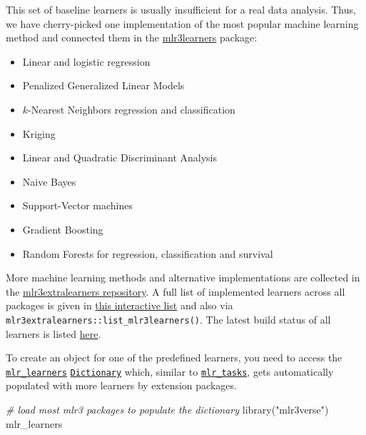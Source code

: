 \documentclass[
]{scrbook}
\newenvironment{Shaded}{\begin{snugshade}}{\end{snugshade}}
\newcommand{\CommentTok}[1]{\textcolor[rgb]{0.56,0.35,0.01}{\textit{#1}}}
\newcommand{\FunctionTok}[1]{\textcolor[rgb]{0.00,0.00,0.00}{#1}}
\newcommand{\NormalTok}[1]{#1}
\newcommand{\StringTok}[1]{\textcolor[rgb]{0.31,0.60,0.02}{#1}}
\providecommand{\tightlist}{%
  \setlength{\itemsep}{0pt}\setlength{\parskip}{0pt}}
\renewenvironment{Shaded} {\begin{snugshade}\small} {\end{snugshade}}
\begin{document}
This set of baseline learners is usually insufficient for a real data analysis.
Thus, we have cherry-picked one implementation of the most popular machine learning method and connected them in the \href{https://mlr3learners.mlr-org.com}{mlr3learners} package:

\begin{itemize}
\tightlist
\item
  Linear and logistic regression
\item
  Penalized Generalized Linear Models
\item
  \(k\)-Nearest Neighbors regression and classification
\item
  Kriging
\item
  Linear and Quadratic Discriminant Analysis
\item
  Naive Bayes
\item
  Support-Vector machines
\item
  Gradient Boosting
\item
  Random Forests for regression, classification and survival
\end{itemize}

More machine learning methods and alternative implementations are collected in the \href{https://github.com/mlr-org/mlr3extralearners/}{mlr3extralearners repository}.
A full list of implemented learners across all packages is given in \href{https://mlr3extralearners.mlr-org.com/articles/learners/list_learners.html}{this interactive list} and also via \texttt{mlr3extralearners::list\_mlr3learners()}.
The latest build status of all learners is listed \href{https://mlr3extralearners.mlr-org.com/articles/learners/learner_status.html}{here}.

To create an object for one of the predefined learners, you need to access the \href{https://mlr3.mlr-org.com/reference/mlr_learners.html}{\texttt{mlr\_learners}} \href{https://mlr3misc.mlr-org.com/reference/Dictionary.html}{\texttt{Dictionary}} which, similar to \href{https://mlr3.mlr-org.com/reference/mlr_tasks.html}{\texttt{mlr\_tasks}}, gets automatically populated with more learners by extension packages.

\begin{Shaded}
\begin{Highlighting}[]
\CommentTok{\# load most mlr3 packages to populate the dictionary}
\FunctionTok{library}\NormalTok{(}\StringTok{"mlr3verse"}\NormalTok{)}
\NormalTok{mlr\_learners}
\end{Highlighting}
\end{Shaded}
\end{document}
